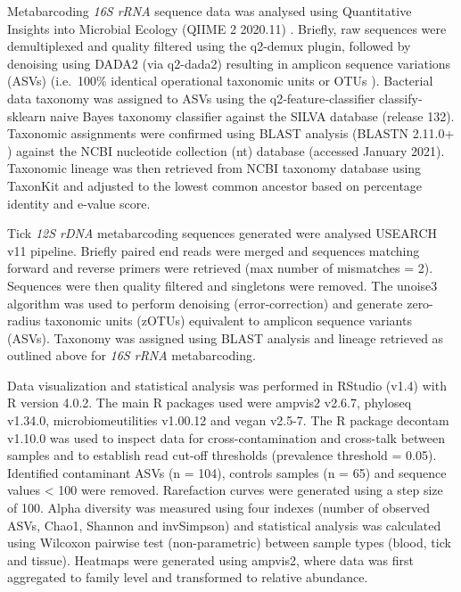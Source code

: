 \documentclass[a4paper, nobind]{templates/ociamthesis}
\begin{document}
Metabarcoding \emph{16S rRNA} sequence data was analysed using Quantitative Insights into Microbial Ecology (QIIME 2 2020.11) \autocite{bolyenReproducibleInteractiveScalable2019}. Briefly, raw sequences were demultiplexed and quality filtered using the q2-demux plugin, followed by denoising using DADA2 (via q2-dada2) \autocite{callahanDADA2HighresolutionSample2016} resulting in amplicon sequence variations (ASVs) (i.e.~100\% identical operational taxonomic units or OTUs \autocite{callahanExactSequenceVariants2017}).
Bacterial data taxonomy was assigned to ASVs using the q2‐feature‐classifier \autocite{bokulichOptimizingTaxonomicClassification2018} classify‐sklearn naive Bayes taxonomy classifier against the SILVA database \autocite{quastSILVARibosomalRNA2013} (release 132).
Taxonomic assignments were confirmed using BLAST analysis (BLASTN 2.11.0+ \autocite{zhangGreedyAlgorithmAligning2000,morgulisDatabaseIndexingProduction2008}) against the NCBI nucleotide collection (nt) database (accessed January 2021).
Taxonomic lineage was then retrieved from NCBI taxonomy database using TaxonKit \autocite{weissHostReproductiveCycle2021} and adjusted to the lowest common ancestor based on percentage identity and e-value score.

Tick \emph{12S rDNA} metabarcoding sequences generated were analysed USEARCH v11 \autocite{edgarSearchClusteringOrders2010} pipeline.
Briefly paired end reads were merged and sequences matching forward and reverse primers were retrieved (max number of mismatches = 2).
Sequences were then quality filtered and singletons were removed.
The unoise3 \autocite{edgarUNOISE2ImprovedErrorcorrection2016} algorithm was used to perform denoising (error-correction) and generate zero-radius taxonomic units (zOTUs) equivalent to amplicon sequence variants (ASVs).
Taxonomy was assigned using BLAST analysis and lineage retrieved as outlined above for \emph{16S rRNA} metabarcoding.

Data visualization and statistical analysis was performed in RStudio (v1.4) with R version 4.0.2. The main R packages used were ampvis2 v2.6.7, phyloseq v1.34.0, microbiomeutilities v1.00.12 and vegan v2.5-7. The R package decontam v1.10.0 \autocite{davisSimpleStatisticalIdentification2018} was used to inspect data for cross-contamination and cross-talk between samples and to establish read cut-off thresholds (prevalence threshold = 0.05). Identified contaminant ASVs (n = 104), controls samples (n = 65) and sequence values \textless{} 100 were removed. Rarefaction curves were generated using a step size of 100. Alpha diversity was measured using four indexes (number of observed ASVs, Chao1, Shannon and invSimpson) and statistical analysis was calculated using Wilcoxon pairwise test (non-parametric) between sample types (blood, tick and tissue). Heatmaps were generated using ampvis2, where data was first aggregated to family level and transformed to relative abundance.
\end{document}
